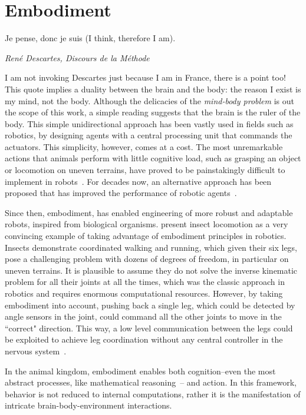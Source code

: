 \section{Embodiment}
\label{ch:intro:Embodiment}
\epigraph{Je pense, donc je suis (I think, therefore I am).}
{\textit{ Ren\'{e} Descartes, Discours de la M\'{e}thode}}
\noindent
I am not invoking Descartes just because I am in France, there is a point too!
This quote implies a duality between the brain and the body: the reason I exist is my mind, not the body.
Although the delicacies of the \emph{mind-body problem} is out the scope of this work, a simple reading suggests that the brain is the ruler of the body.
This simple unidirectional approach has been vastly used in fields such as robotics, by designing agents with a central processing unit that commands the actuators.
This simplicity, however, comes at a cost.
The most unremarkable actions that animals perform with little cognitive load, such as grasping an object or locomotion on uneven terrains, have proved to be painstakingly difficult to implement in robots~\cite{Pfeifer2006Book}.
For decades now, an alternative approach has been proposed that has improved the performance of robotic agents~\cite{Brooks1991AI}.
\par
Since then, embodiment, has enabled engineering of more robust and adaptable robots, inspired from biological organisms.
\citeauthor{Pfeifer2007Sci} present insect locomotion as a very convincing example of taking advantage of embodiment principles in robotics.
Insects demonstrate coordinated walking and running, which given their six legs, pose a challenging problem with dozens of degrees of freedom, in particular on uneven terrains.
It is plausible to assume they do not solve the inverse kinematic problem for all their joints at all the times, which was the classic approach in robotics and requires enormous computational resources.
However, by taking embodiment into account, pushing back a single leg, which could be detected by angle sensors in the joint, could command all the other joints to move in the ``correct" direction.
This way, a low level communication between the legs could be exploited to achieve leg coordination without any central controller in the nervous system~\cite{Pfeifer2007Sci}.
\par
In the animal kingdom, embodiment enables both cognition--even the most abstract processes, like mathematical reasoning~\cite{Lakoff2000Book}-- and action.
In this framework, behavior is not reduced to internal computations, rather it is the manifestation of intricate brain-body-environment interactions.
